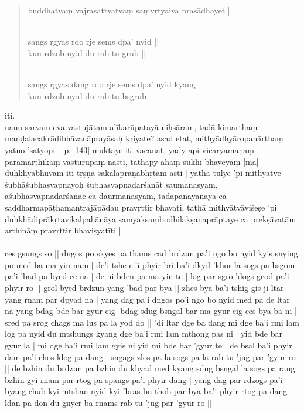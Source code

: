 \documentclass[12pt]{article}
\begin{document}
\begin{quote}
	buddhatvaṃ vajrasattvatvaṃ saṃvṛtyaiva prasādhayet |

	\textbf{\TVA}\\
	sangs rgyas rdo rje sems dpa' nyid ||\\
	kun rdzob nyid du rab tu grub ||

	\textbf{\TVB}\\
	sangs rgyas dang rdo rje sems dpa' nyid kyang\\
	kun rdzob nyid du rab tu bsgrub
\end{quote}

iti.\\

nanu sarvam eva vastujātam alīkarūpatayā niḥsāram, tadā kimarthaṃ maṇḍalacakrādibhāvanāprayāsaḥ kriyate? asad etat, mithyādhyāropaṇārthaṃ yatno 'satyopi [\EDD\ p.\ 143] muktaye iti vacanāt. yady api vicāryamāṇaṃ pāramārthikaṃ vasturūpaṃ nāsti, tathāpy ahaṃ sukhī bhaveyaṃ [mā] duḥkhyabhūvam iti tṛṣṇā sakalaprāṇabhṛtām asti | yathā tulye 'pi mithyātve śubhāśubhasvapnayoḥ śubhasvapnadarśanāt saumanasyam, aśubhasvapnadarśanāc ca daurmanasyam, tadapanayanāya ca saddharmapāṭhamantrajāpādau pravṛttir bhavati, tathā mithyātvāviśeṣe 'pi duḥkhādiprākṛtavikalpahānāya samyaksaṃbodhilakṣaṇaprāptaye ca prekṣāvatām arthināṃ pravṛttir bhaviṣyatīti |\\

\textbf{\TVA}\\
ces gsungs so || dngos po skyes pa thams cad brdzun pa'i ngo bo nyid kyis snying po med ba ma yin nam | de'i tshe ci'i phyir bri ba'i dkyil 'khor la sogs pa bsgom pa'i 'bad pa byed ce na | de ni bden pa ma yin te | log par sgro 'dogs gcod pa'i phyir ro ||  grol byed brdzun yang 'bad par bya || zhes bya ba'i tshig gis ji ltar yang rnam par dpyad na | yang dag pa'i dngos po'i ngo bo nyid med pa de ltar na yang bdag bde bar gyur cig  |bdag sdug bsngal bar ma gyur cig ces bya ba ni | sred pa srog chags ma lus pa la yod do || 'di ltar dge ba dang mi dge ba'i rmi lam log pa nyid du mtshungs kyang dge ba'i rmi lam mthong pas ni | yid bde bar gyur la | mi dge ba'i rmi lam gyis ni yid mi bde bar 'gyur te | de bsal ba'i phyir dam pa'i chos klog pa dang | sngags zlos pa la sogs pa la rab tu 'jug par 'gyur ro || de bzhin du brdzun pa bzhin du khyad med kyang sdug bsngal la sogs pa rang bzhin gyi rnam par rtog pa spangs pa'i phyir dang | yang dag par rdzogs pa'i byang chub kyi mtshan nyid kyi 'bras bu thob par bya ba'i phyir rtog pa dang ldan pa don du gnyer ba rnams rab tu 'jug par 'gyur ro || \\
\end{document}

